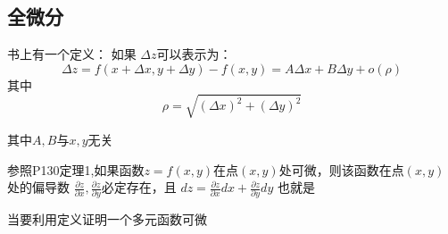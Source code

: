 \subsection{全微分}
\par 书上有一个定义：
如果 $\Delta z$可以表示为：
\begin{equation}
\Delta z = f(x + \Delta x, y + \Delta y) - f(x, y) = A \Delta x + B \Delta y + o(\rho)
\end{equation}
其中 
$$
\rho = \sqrt{(\Delta x)^2 + (\Delta y)^2}
$$
\par 其中$A,B$与$x,y$无关
\par
参照P130定理1,如果函数$z=f(x,y)$在点$(x,y)$处可微，则该函数在点$(x,y)$处的偏导数
$\frac{\partial z}{\partial x}, \frac{\partial z}{\partial y}$必定存在，且
$dz =\frac{\partial z}{\partial x}dx + \frac{\partial z}{\partial y}dy$ 
也就是
\begin{equation}

\end{equation}





当要利用定义证明一个多元函数可微











